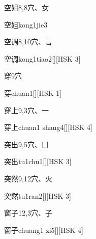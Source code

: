 \begin{entry}{空姐}{8,8}{⽳、⼥}
  \begin{phonetics}{空姐}{kong1jie3}
  \end{phonetics}
\end{entry}

\begin{entry}{空调}{8,10}{⽳、⾔}
  \begin{phonetics}{空调}{kong1tiao2}[][HSK 3]
  \end{phonetics}
\end{entry}

\begin{entry}{穿}{9}{⽳}
  \begin{phonetics}{穿}{chuan1}[][HSK 1]
  \end{phonetics}
\end{entry}

\begin{entry}{穿上}{9,3}{⽳、⼀}
  \begin{phonetics}{穿上}{chuan1 shang4}[][HSK 4]
  \end{phonetics}
\end{entry}

\begin{entry}{突出}{9,5}{⽳、⼐}
  \begin{phonetics}{突出}{tu1chu1}[][HSK 3]
  \end{phonetics}
\end{entry}

\begin{entry}{突然}{9,12}{⽳、⽕}
  \begin{phonetics}{突然}{tu1ran2}[][HSK 3]
  \end{phonetics}
\end{entry}

\begin{entry}{窗子}{12,3}{⽳、⼦}
  \begin{phonetics}{窗子}{chuang1 zi5}[][HSK 4]
  \end{phonetics}
\end{entry}

